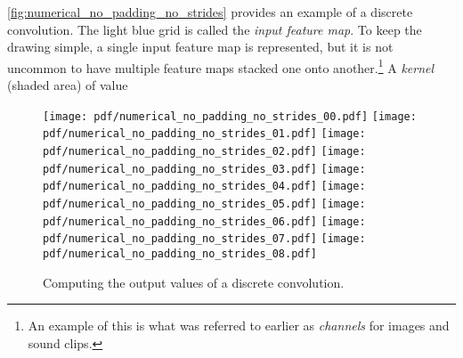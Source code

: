 \documentclass[notitlepage]{report}
\begin{document}
\autoref{fig:numerical_no_padding_no_strides} provides an example of a discrete
convolution. The light blue grid is called the {\em input feature map}. To keep
the drawing simple, a single input feature map is represented, but it is not
uncommon to have multiple feature maps stacked one onto another.\footnote{%
    An example of this is what was referred to earlier as {\em channels\/} for
    images and sound clips.}
A {\em kernel\/} (shaded area) of value

\begin{figure}[H]
    \centering
\end{figure}

\begin{figure}[p]
    \centering
    \texttt{[image: pdf/numerical\_no\_padding\_no\_strides\_00.pdf]}
    \texttt{[image: pdf/numerical\_no\_padding\_no\_strides\_01.pdf]}
    \texttt{[image: pdf/numerical\_no\_padding\_no\_strides\_02.pdf]}
    \texttt{[image: pdf/numerical\_no\_padding\_no\_strides\_03.pdf]}
    \texttt{[image: pdf/numerical\_no\_padding\_no\_strides\_04.pdf]}
    \texttt{[image: pdf/numerical\_no\_padding\_no\_strides\_05.pdf]}
    \texttt{[image: pdf/numerical\_no\_padding\_no\_strides\_06.pdf]}
    \texttt{[image: pdf/numerical\_no\_padding\_no\_strides\_07.pdf]}
    \texttt{[image: pdf/numerical\_no\_padding\_no\_strides\_08.pdf]}
    \caption{\label{fig:numerical_no_padding_no_strides} Computing the output
        values of a discrete convolution.}
\end{figure}
\end{document}
